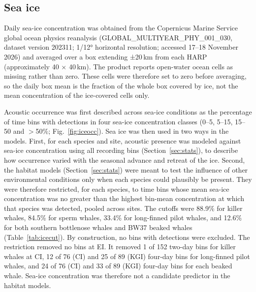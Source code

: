 \documentclass[11pt]{article}
\newcommand{\unit}[1]{\,#1}
\begin{document}
\subsection{Sea ice}\label{sec:ice}
Daily sea-ice concentration was obtained from the Copernicus Marine Service global ocean physics reanalysis (GLOBAL\_MULTIYEAR\_PHY\_001\_030, dataset version 202311; 1/12° horizontal resolution; accessed 17--18 November 2026) and averaged over a box extending ±20\unit{km} from each HARP (approximately 40 × 40\unit{km}). The product reports open-water ocean cells as missing rather than zero. These cells were therefore set to zero before averaging, so the daily box mean is the fraction of the whole box covered by ice, not the mean concentration of the ice-covered cells only.

Acoustic occurrence was first described across sea-ice conditions as the percentage of time bins with detections in four sea-ice concentration classes (0--5, 5--15, 15--50 and $>$50\%; Fig.~\ref{fig:iceocc}). Sea ice was then used in two ways in the models. First, for each species and site, acoustic presence was modeled against sea-ice concentration using all recording bins (Section~\ref{sec:stats}), to describe how occurrence varied with the seasonal advance and retreat of the ice. Second, the habitat models (Section~\ref{sec:stats}) were meant to test the influence of other environmental conditions only when each species could plausibly be present. They were therefore restricted, for each species, to time bins whose mean sea-ice concentration was no greater than the highest bin-mean concentration at which that species was detected, pooled across sites. The cutoffs were 88.9\% for killer whales, 84.5\% for sperm whales, 33.4\% for long-finned pilot whales, and 12.6\% for both southern bottlenose whales and BW37 beaked whales (Table~\ref{tab:icecut}). By construction, no bins with detections were excluded. The restriction removed no bins at EI. It removed 1 of 152 two-day bins for killer whales at CI, 12 of 76 (CI) and 25 of 89 (KGI) four-day bins for long-finned pilot whales, and 24 of 76 (CI) and 33 of 89 (KGI) four-day bins for each beaked whale. Sea-ice concentration was therefore not a candidate predictor in the habitat models.
\end{document}
